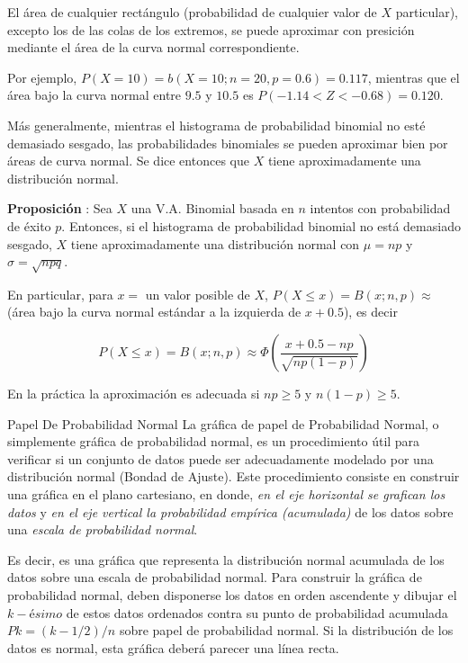 \documentclass[
  10pt,
  ignorenonframetext,
]{beamer}
\begin{document}
\begin{frame}{}
\protect\hypertarget{section-37}{}
El área de cualquier rectángulo (probabilidad de cualquier valor de
\(X\) particular), excepto los de las colas de los extremos, se puede
aproximar con presición mediante el área de la curva normal
correspondiente.

Por ejemplo, \(P(X = 10) = b(X=10; n =20, p = 0.6) = 0.117\), mientras
que el área bajo la curva normal entre \(9.5\) y \(10.5\) es
\(P(-1.14 < Z < -0.68) = 0.120\).

Más generalmente, mientras el histograma de probabilidad binomial no
esté demasiado sesgado, las probabilidades binomiales se pueden
aproximar bien por áreas de curva normal. Se dice entonces que \(X\)
tiene aproximadamente una distribución normal.
\end{frame}

\begin{frame}{}
\protect\hypertarget{section-38}{}
\textbf{Proposición} : Sea \(X\) una V.A. Binomial basada en \(n\)
intentos con probabilidad de éxito \(p\). Entonces, si el histograma de
probabilidad binomial no está demasiado sesgado, \(X\) tiene
aproximadamente una distribución normal con \(\mu = np\) y
\(\sigma = \sqrt{npq}\).

En particular, para \(x =\) un valor posible de \(X\),
\(P(X \le x) = B(x;n,p) \approx\) (área bajo la curva normal estándar a
la izquierda de \(x + 0.5\)), es decir

\[P(X \le x) = B(x;n,p)  \approx \Phi \left( \frac{x+0.5-np}{\sqrt{np(1-p)}}\right)\]

En la práctica la aproximación es adecuada si \(np \ge 5\) y
\(n(1-p) \ge 5\).
\end{frame}

\begin{frame}{Papel De Probabilidad Normal}
\protect\hypertarget{papel-de-probabilidad-normal}{}
La gráfica de papel de Probabilidad Normal, o simplemente gráfica de
probabilidad normal, es un procedimiento útil para verificar si un
conjunto de datos puede ser adecuadamente modelado por una distribución
normal (Bondad de Ajuste). Este procedimiento consiste en construir una
gráfica en el plano cartesiano, en donde, \emph{en el eje horizontal se
grafican los datos} y \emph{en el eje vertical la probabilidad empírica
(acumulada)} de los datos sobre una \emph{escala de probabilidad
normal}.

Es decir, es una gráfica que representa la distribución normal acumulada
de los datos sobre una escala de probabilidad normal. Para construir la
gráfica de probabilidad normal, deben disponerse los datos en orden
ascendente y dibujar el \(k-ésimo\) de estos datos ordenados contra su
punto de probabilidad acumulada \(Pk = (k - 1/2)/n\) sobre papel de
probabilidad normal. Si la distribución de los datos es normal, esta
gráfica deberá parecer una línea recta.
\end{frame}
\end{document}
